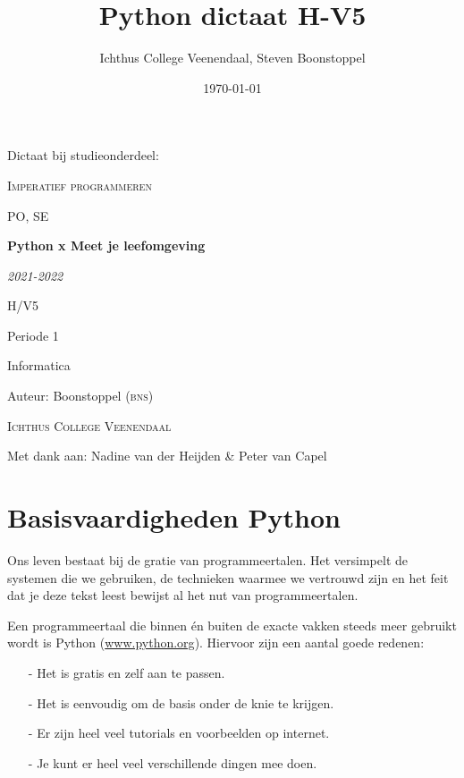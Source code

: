 \documentclass[a4paper,11pt, fleqn]{article}
\title{Python dictaat H-V5}
\author{Ichthus College Veenendaal, Steven Boonstoppel}
\date{\today}
\newcommand{\ditwc}{Naam van het huidige werkcollege}
\begin{document}
\begin{titlepage}
	{\LARGE Dictaat bij studieonderdeel:\par}
	\vspace{1cm}
	{\scshape\LARGE Imperatief programmeren\par}
	\vspace{1cm}
	{\scshape\Large PO, SE\par}
	\vspace{2cm}
	{\Huge\bfseries Python x Meet je leefomgeving\par}
	\vspace{2cm}
	{\Large\itshape 2021-2022\par}
	\vfill
	H/V5\par
	Periode 1\par
	Informatica\par
	Auteur: Boonstoppel \textsc{(bns)}\par
	\textsc{Ichthus College Veenendaal}\par
	Met dank aan: Nadine van der Heijden \& Peter van Capel
\end{titlepage}

\tableofcontents

\clearpage
\renewcommand{\ditwc}{Basisvaardigheden Python}
\section[Basisvaardigheden Python]{\ditwc}
\label{Ch_basisvaardigheden}
Ons leven bestaat bij de gratie van programmeertalen. Het versimpelt de systemen die we gebruiken, de technieken waarmee we vertrouwd zijn en het feit dat je deze tekst leest bewijst al het nut van programmeertalen.
 
Een programmeertaal die binnen \'en buiten de exacte vakken steeds meer gebruikt wordt is Python (\url{www.python.org}). Hiervoor zijn een aantal goede redenen:
\begin{itemize}
\item[-] Het is gratis en zelf aan te passen.
\item[-] Het is eenvoudig om de basis onder de knie te krijgen.
\item[-] Er zijn heel veel tutorials en voorbeelden op internet.
\item[-] Je kunt er heel veel verschillende dingen mee doen.
\end{itemize}
\end{document}
